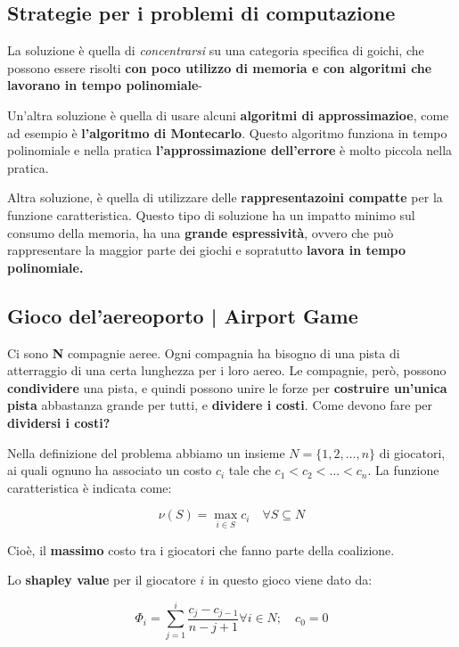 \subsection{Strategie per i problemi di computazione}

La soluzione è quella di \textit{concentrarsi} su una categoria specifica di
goichi, che possono essere risolti \textbf{con poco utilizzo di memoria e con
    algoritmi che lavorano in tempo polinomiale}-

Un'altra soluzione è quella di usare alcuni \textbf{algoritmi di
    approssimazioe}, come ad esempio è \textbf{l'algoritmo di Montecarlo}. Questo
algoritmo funziona in tempo polinomiale e nella pratica
\textbf{l'approssimazione dell'errore} è molto piccola nella pratica.

Altra soluzione, è quella di utilizzare delle \textbf{rappresentazoini
    compatte} per la funzione caratteristica. Questo tipo di soluzione ha un
impatto minimo sul consumo della memoria, ha una \textbf{grande espressività},
ovvero che può rappresentare la maggior parte dei giochi e sopratutto
\textbf{lavora in tempo polinomiale.}

\subsection{Gioco del'aereoporto | Airport Game}

\begin{definition}
    Ci sono \textbf{N} compagnie aeree. Ogni compagnia ha bisogno di una pista di atterraggio di una certa lunghezza per i loro aereo.
    Le compagnie, però, possono \textbf{condividere} una pista, e quindi possono unire le forze per \textbf{costruire un'unica pista} abbastanza grande per tutti, e \textbf{dividere i costi}. Come devono fare per \textbf{dividersi i costi?}
\end{definition}

Nella definizione del problema abbiamo un insieme $N = \{1,2,\dots,n\}$ di
giocatori, ai quali ognuno ha associato un costo $c_i$ tale che $c_1 < c_2 <
    \dots < c_n$. La funzione caratteristica è indicata come:

\[
    \nu(S) = \max_{i \in S} c_i \quad \forall S \subseteq N
\]

Cioè, il \textbf{massimo} costo tra i giocatori che fanno parte della
coalizione.

Lo \textbf{shapley value} per il giocatore $i$ in questo gioco viene dato da:

\[
    \Phi_i = \sum_{j=1}^i \frac{c_j - c_{j-1}}{n - j +1}  \forall i \in N; \quad c_0 = 0
\]

